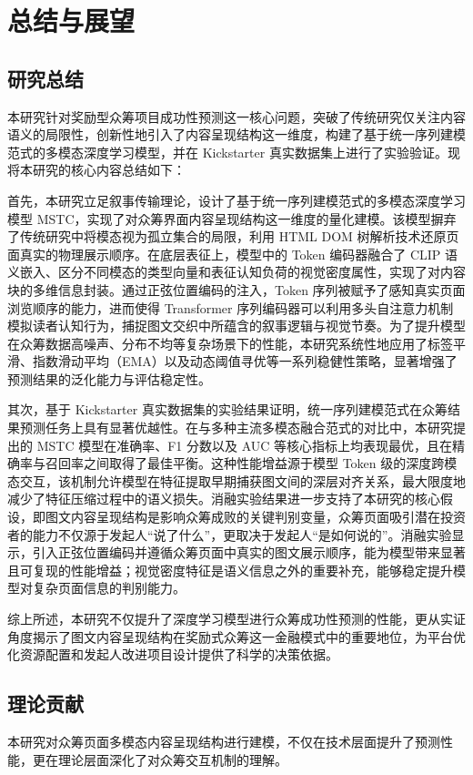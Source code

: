 \newpage
\setcounter{table}{0}
\setcounter{figure}{0}
\section{总结与展望}
\subsection{研究总结}
本研究针对奖励型众筹项目成功性预测这一核心问题，突破了传统研究仅关注内容语义的局限性，创新性地引入了内容呈现结构这一维度，构建了基于统一序列建模范式的多模态深度学习模型，并在 Kickstarter 真实数据集上进行了实验验证。现将本研究的核心内容总结如下：

首先，本研究立足叙事传输理论，设计了基于统一序列建模范式的多模态深度学习模型 MSTC，实现了对众筹界面内容呈现结构这一维度的量化建模。该模型摒弃了传统研究中将模态视为孤立集合的局限，利用 HTML DOM 树解析技术还原页面真实的物理展示顺序。在底层表征上，模型中的 Token 编码器融合了 CLIP 语义嵌入、区分不同模态的类型向量和表征认知负荷的视觉密度属性，实现了对内容块的多维信息封装。通过正弦位置编码的注入，Token 序列被赋予了感知真实页面浏览顺序的能力，进而使得 Transformer 序列编码器可以利用多头自注意力机制模拟读者认知行为，捕捉图文交织中所蕴含的叙事逻辑与视觉节奏。为了提升模型在众筹数据高噪声、分布不均等复杂场景下的性能，本研究系统性地应用了标签平滑、指数滑动平均（EMA）以及动态阈值寻优等一系列稳健性策略，显著增强了预测结果的泛化能力与评估稳定性。

其次，基于 Kickstarter 真实数据集的实验结果证明，统一序列建模范式在众筹结果预测任务上具有显著优越性。在与多种主流多模态融合范式的对比中，本研究提出的 MSTC 模型在准确率、F1 分数以及 AUC 等核心指标上均表现最优，且在精确率与召回率之间取得了最佳平衡。这种性能增益源于模型 Token 级的深度跨模态交互，该机制允许模型在特征提取早期捕获图文间的深层对齐关系，最大限度地减少了特征压缩过程中的语义损失。消融实验结果进一步支持了本研究的核心假设，即图文内容呈现结构是影响众筹成败的关键判别变量，众筹页面吸引潜在投资者的能力不仅源于发起人“说了什么”，更取决于发起人“是如何说的”。消融实验显示，引入正弦位置编码并遵循众筹页面中真实的图文展示顺序，能为模型带来显著且可复现的性能增益；视觉密度特征是语义信息之外的重要补充，能够稳定提升模型对复杂页面信息的判别能力。

综上所述，本研究不仅提升了深度学习模型进行众筹成功性预测的性能，更从实证角度揭示了图文内容呈现结构在奖励式众筹这一金融模式中的重要地位，为平台优化资源配置和发起人改进项目设计提供了科学的决策依据。

\subsection{理论贡献}
本研究对众筹页面多模态内容呈现结构进行建模，不仅在技术层面提升了预测性能，更在理论层面深化了对众筹交互机制的理解。

